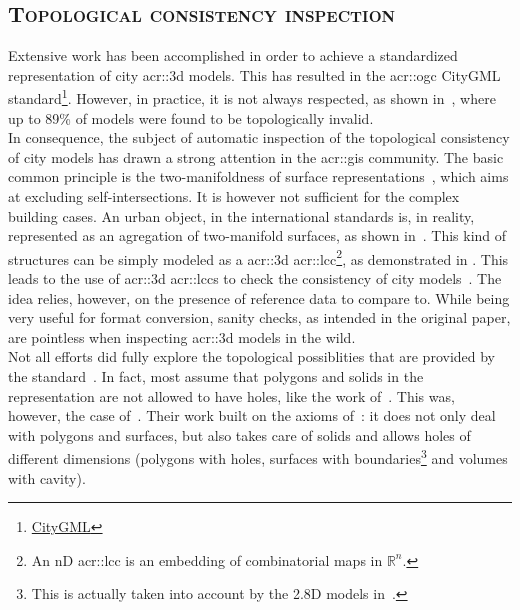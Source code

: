     \subsection{\textsc{Topological consistency inspection}}
        \label{subsec::introduction::building_model_evaluation::topological}
        Extensive work has been accomplished in order to achieve a standardized representation of city \gls{acr::3d} models.
        This has resulted in the \gls{acr::ogc} CityGML standard\footnote{\href{https://www.opengeospatial.org/standards/citygml}{CityGML}}.
        However, in practice, it is not always respected, as shown in~\textcite{biljecki2016most}, where up to 89\% of models were found to be topologically invalid.\\

        In consequence, the subject of automatic inspection of the topological consistency of city models has drawn a strong attention in the \gls{acr::gis} community.
        The basic common principle is the two-manifoldness of surface representations~\parencite{groger2011achieve}, which aims at excluding self-intersections.
        It is however not sufficient for the complex building cases.
        An urban object, in the international standards is, in reality, represented as an agregation of two-manifold surfaces, as shown in~\textcite{groger2011achieve, ledoux2013validation}.
        This kind of structures can be simply modeled as a \gls{acr::3d} \gls{acr::lcc}\parencite{damiand2014combinatorial}\footnote{
            An nD \gls{acr::lcc} is an embedding of combinatorial maps in \(\mathbb{R}^n\).
        }, as demonstrated in \textcite{diakite2014topological}.
        This leads to the use of \gls{acr::3d} \glspl{acr::lcc} to check the consistency of city models~\parencite{gorszczyk2016automatic}.
        The idea relies, however, on the presence of reference data to compare to.
        While being very useful for format conversion, sanity checks, as intended in the original paper, are pointless when inspecting \gls{acr::3d} models in the wild.\\
        Not all efforts did fully explore the topological possiblities that are provided by the standard~\parencite{biljecki2016most, ledoux2013validation}.
        In fact, most assume that polygons and solids in the representation are not allowed to have holes, like the work of~\textcite{groger2011achieve, alam2014towards}.
        This was, however, the case of~\textcite{ledoux2013validation}.
        Their work built on the axioms of~\textcite{groger2011achieve}: it does not only deal with polygons and surfaces, but also takes care of solids and allows holes of different dimensions (polygons with holes, surfaces with boundaries\footnote{
            This is actually taken into account by the 2.8D models in~\textcite{groger2011achieve}.
        } and volumes with cavity).
